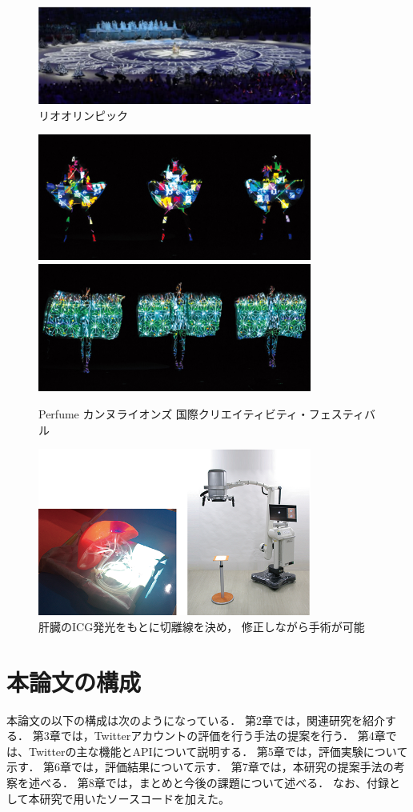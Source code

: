 \begin{figure}[b]
    \centering
    \includegraphics[width=9cm]{image/rio.png}
    \caption{リオオリンピック\cite{rioprojection}}
  \label{rio}
\end{figure}

\clearpage

\begin{figure}[t]
    \centering
    \includegraphics[width=9cm]{image/perfume1.png}
    \includegraphics[width=9cm]{image/perfume2.png}
    \caption{Perfume カンヌライオンズ 
    \protect\linebreak 国際クリエイティビティ・フェスティバル\cite{kirameku}}
  \label{perfume}
\end{figure}



\begin{figure}[b]
  \centering
  \includegraphics[width=9cm]{image/syujutsu.png}
  \caption{肝臓のICG発光をもとに切離線を決め，
  \protect\linebreak 修正しながら手術が可能\cite{iryou}}
\label{syujutsu}
\end{figure}



\clearpage
\section{本論文の構成}
本論文の以下の構成は次のようになっている．
第2章では，関連研究を紹介する．
第3章では，Twitterアカウントの評価を行う手法の提案を行う．
第4章では、Twitterの主な機能とAPIについて説明する．
第5章では，評価実験について示す．
第6章では，評価結果について示す．
第7章では，本研究の提案手法の考察を述べる．
第8章では，まとめと今後の課題について述べる．
なお、付録として本研究で用いたソースコードを加えた。
